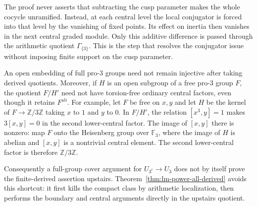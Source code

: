 \begin{remark}\label{rem:central-induction}
The proof never asserts that subtracting the cusp parameter makes the
whole cocycle unramified.  Instead, at each central level the local
conjugator is forced into that level by the vanishing of fixed points.
Its effect on inertia then vanishes in the next central graded module.
Only this additive difference is passed through the arithmetic quotient
$\Gamma_{\{3\}}$.  This is the step that resolves the conjugator issue
without imposing finite support on the cusp parameter.
\end{remark}

\begin{remark}
\label{rem:lm-derived-cover-obstruction}
An open embedding of full pro-$3$ groups need not remain
injective after taking derived quotients.  Moreover, if
$H$ is an open subgroup of a free pro-$3$ group $F$,
the quotient $F/H'$ need not have torsion-free ordinary
central factors, even though it retains $F^{\mathrm{ab}}$.
For example, let $F$ be free on $x,y$ and let $H$ be the
kernel of $F\to\mathbb Z/3\mathbb Z$ taking $x$ to $1$
and $y$ to $0$.  In $F/H'$, the relation $[x^3,y]=1$
makes $3[x,y]=0$ in the second lower-central factor.
The image of $[x,y]$ there is nonzero: map $F$ onto the
Heisenberg group over $\mathbb F_3$, where the image of
$H$ is abelian and $[x,y]$ is a nontrivial central element.
The second lower-central factor is therefore
$\mathbb Z/3\mathbb Z$.

Consequently a full-group cover argument for $U_{3^r}\to U_3$
does not by itself prove the finite-derived assertion upstairs.
Theorem~\ref{thm:lm-power-all-derived} avoids this shortcut: it first
kills the compact class by arithmetic localization, then performs
the boundary and central arguments directly in the upstairs quotient.
\end{remark}
